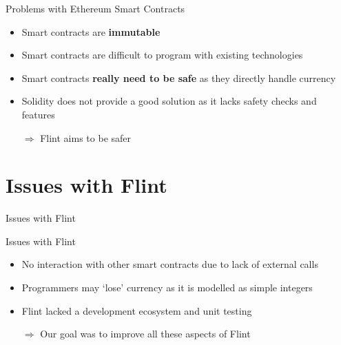 \documentclass[aspectratio=169]{beamer}
\newcommand{\sectionslide}[1]{%
  \section{#1}
  \begin{frame}
  \begin{center}
    \vbox{}
    {\LARGE \usebeamercolor[fg]{title} #1}
    \par
  \end{center}
  \end{frame}
}
\begin{document}
\begin{frame}{Problems with Ethereum Smart Contracts}
    \begin{itemize}
        \item Smart contracts are \textbf{immutable}
        \item Smart contracts are difficult to program with existing technologies
        \item Smart contracts \textbf{really need to be safe} as they directly handle currency
        \item Solidity does not provide a good solution as it lacks safety checks and features
        \item[$\Rightarrow$] Flint aims to be safer
    \end{itemize}
\end{frame}

\sectionslide{Issues with Flint}
\begin{frame}{Issues with Flint}
    \begin{itemize}
        \item No interaction with other smart contracts due to lack of external calls
        \item Programmers may `lose' currency as it is modelled as simple integers
        \item Flint lacked a development ecosystem and unit testing
        \item[$\Rightarrow$] Our goal was to improve all these aspects of Flint
    \end{itemize}
\end{frame}
\end{document}
